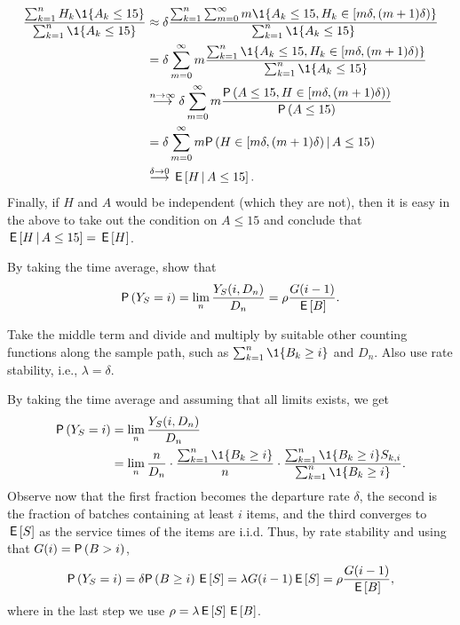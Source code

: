 \begin{exercise}
\begin{solution}
\begin{align*}
\frac{ \sum_{k=1}^n H_k \1{A_k\leq 15}}{\sum_{k=1}^n \1{A_k \leq 15}} 
&\approx
\delta \frac{ \sum_{k=1}^n  \sum_{m=0}^\infty m \1{A_k\leq 15, H_k \in [m\delta, (m+1)\delta)}}{\sum_{k=1}^n \1{A_k \leq 15}}  \\
&= \delta \sum_{m=0}^\infty m \frac{ \sum_{k=1}^n   \1{A_k\leq 15, H_k \in [m\delta, (m+1)\delta)}}{\sum_{k=1}^n \1{A_k \leq 15}}  \\
&\stackrel{n\to\infty}{\longrightarrow} \delta \sum_{m=0}^\infty m \frac{ \P{{A\leq 15, H \in [m\delta, (m+1)\delta)}}}{\P{A \leq 15}}  \\
&=\delta \sum_{m=0}^\infty m \P{H \in [m\delta, (m+1)\delta)\given A \leq 15} \\
&\stackrel{\delta\to0}{\longrightarrow}  \E{H\given A \leq 15}.
\end{align*}
Finally, if $H$ and $A$ would be independent (which they are not), then it is easy  in the above to take out the condition on $A\leq 15$ and conclude that $\,\mathsf{E}\left[H\,\middle|\, A\leq 15\right] = \,\mathsf{E}\left[H\right]$. 
\end{solution}
\end{exercise}


\begin{exercise}\label{ex:14}
By taking the time average, show that
\begin{equation*}
\P{Y_S=i} =\lim_n  \frac{Y_S(i, D_n)}{D_n} = \rho \frac{G(i-1)}{\E B}.
\end{equation*}
\begin{hint}
  Take the middle term and divide and multiply by suitable other counting functions along the sample path, such as $\sum_{k=1}^n \1{B_k \geq i}$ and $D_n$. Also use rate stability, i.e., $\lambda=\delta$. 
\end{hint}
  \begin{solution}
By taking the time average and assuming that all limits exists, we get
\begin{equation*}
  \begin{split}
\P{Y_S=i} &=\lim_n  \frac{Y_S(i, D_n)}{D_n} \\
&= \lim_n \frac{n}{D_n} \cdot \frac{\sum_{k=1}^n \1{B_k\geq i}}n \cdot
\frac{\sum_{k=1}^n \1{B_k\geq i} S_{k,i}}{\sum_{k=1}^n \1{B_k\geq i}}.
  \end{split}
\end{equation*}
Observe now that the first fraction becomes the departure rate $\delta$, the second is the fraction of batches containing at least $i$ items, and the third converges to $\,\mathsf{E}\left[S\right]$ as the service times of  the items are i.i.d.  Thus, by rate stability and using that $G(i)=\P{B>i}$, 
\begin{equation*}
\P{Y_S=i} = \delta \P{B\geq i} \E S = \lambda G(i-1) \E S = \rho \frac{G(i-1)}{\E B},
\end{equation*}
where in the last step we use $\rho=\lambda \,\mathsf{E}\left[S\right] \,\mathsf{E}\left[B\right]$.
  \end{solution}
\end{exercise}


